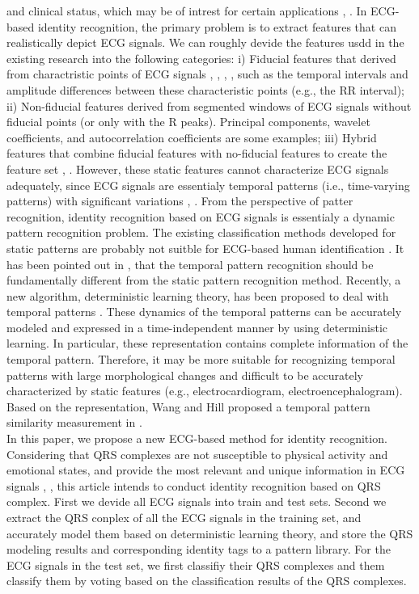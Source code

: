 \documentclass[onecolumn,12pt]{article}
\begin{document}
and clinical status, which may be of intrest for certain applications \cite{citation18}, \cite{citation21}. In ECG-based identity recognition, the primary problem is to extract features that can realistically depict ECG signals. We can roughly devide the features usdd in the existing research into the following categories: i) Fiducial features that derived from charactristic points of ECG signals \cite{citation15}, \cite{citation16}, \cite{citation19}, \cite{citation21}, such as the temporal intervals and amplitude differences between these characteristic points (e.g., the RR interval); ii) Non-fiducial features derived from segmented windows of ECG signals \cite{citation22, citation23, citation24} without fiducial points (or only with the R peaks). Principal components, wavelet coefficients, and autocorrelation coefficients are some examples; iii) Hybrid features that combine fiducial features with no-fiducial features to create the feature set \cite{citation3}, \cite{citation25}. However, these static features cannot characterize ECG signals adequately, since ECG signals are essentialy temporal patterns (i.e., time-varying patterns) with significant variations \cite{citation26}, \cite{citation27}. From the perspective of patter recognition, identity recognition based on ECG signals is essentialy a dynamic pattern recognition problem. The existing classification methods developed for static patterns are probably not suitble for ECG-based human identification \cite{citation27}. It has been pointed out in \cite{citation28}, \cite{citation29} that the temporal pattern recognition should be fundamentally different from the static pattern recognition method. Recently, a new algorithm, deterministic learning theory, has been proposed to deal with temporal patterns \cite{citation29, citation30, citation31}. These dynamics of the temporal patterns can be accurately modeled and expressed in a time-independent manner by using deterministic learning. In particular, these representation contains complete information of the temporal pattern. Therefore, it may be more suitable for recognizing temporal patterns with large morphological changes and difficult to be accurately characterized by static features (e.g., electrocardiogram, electroencephalogram). Based on the representation, Wang and Hill proposed a temporal pattern similarity measurement in \cite{citation31}.\\In this paper, we propose a new ECG-based method for identity recognition. Considering that QRS complexes are not susceptible to physical activity and emotional states, and provide the most relevant and unique information in ECG signals \cite{citation10}, \cite{citation32}, this article intends to conduct identity recognition based on QRS complex. First we devide all ECG signals into train and test sets. Second we extract the QRS conplex of all the ECG signals in the training set, and accurately model them based on deterministic learning theory, and store the QRS modeling results and corresponding identity tags to a pattern library. For the ECG signals in the test set, we first classifiy their QRS complexes and them classify them by voting based on the classification results of the QRS complexes.
\end{document}
